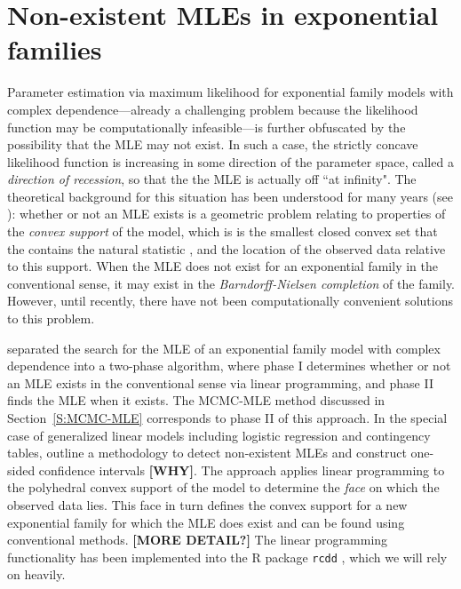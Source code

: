 \section{Non-existent MLEs in exponential families} \label{S:Non-existent MLE}
Parameter estimation via maximum likelihood for exponential family models with 
complex dependence---already a 
challenging problem because the likelihood function may be computationally 
infeasible---is further obfuscated by the possibility that the MLE
may not exist.  
In such a case, the strictly concave likelihood function is
increasing in some direction of the parameter space, called a 
\emph{direction of recession}, so that the the MLE is actually off ``at infinity".
The theoretical background 
for this situation has been understood for many years 
(see \citep{Barndorff,Brown:1986}): whether or not an MLE exists is a
geometric problem relating to properties of the \emph{convex support} of the model,
which is  is the smallest closed convex set 
that the contains the natural statistic \citep{Geyer:gdor},
and the location of the observed data relative to this support.
When the MLE does not exist for
an exponential family in the conventional sense, 
it may exist in the \emph{Barndorff-Nielsen completion} of the family.
However, until recently, there have not been computationally convenient
solutions to this problem.

\citet{Geyer:1992} separated the search for the MLE of an exponential family model
with complex dependence into a two-phase algorithm, 
where phase I determines whether or not an MLE exists in the conventional 
sense via linear programming, and phase II finds the MLE when it exists.
The MCMC-MLE method discussed in Section~\ref{S:MCMC-MLE} corresponds to phase II of
this approach.
In the special case of generalized linear models including logistic regression and contingency 
tables, \citet{Geyer:gdor} outline a methodology to detect non-existent MLEs and construct 
one-sided confidence intervals \textbf{[WHY]}.
The approach applies linear programming to the polyhedral convex support of 
the model to determine the \emph{face} on which the observed data lies.  
This face in turn defines the convex support for a new exponential family for which the MLE 
does exist and can be found using conventional methods.  \textbf{[MORE DETAIL?]}
The linear programming 
functionality has been implemented into the R package \texttt{rcdd} \citep*{rcdd:R},
which we will rely on heavily.

